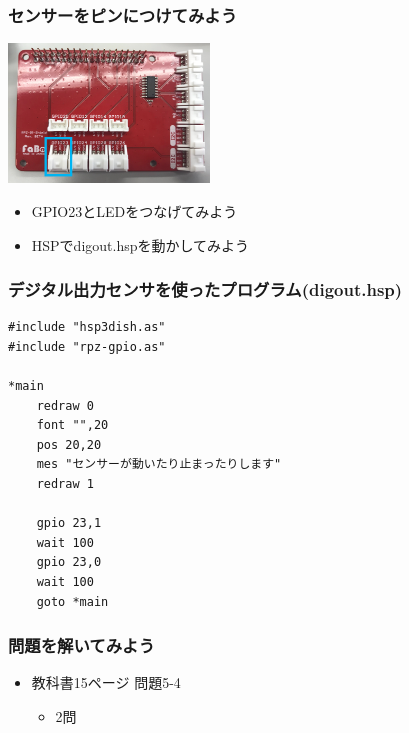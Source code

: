 \begin{frame}
    \frametitle{センサーをピンにつけてみよう}
    \begin{center}
        \includegraphics[width=0.4\textwidth]{images/chap05/text05-img027.png}
        \begin{itemize}
            \item GPIO23とLEDをつなげてみよう
            \item HSPでdigout.hspを動かしてみよう
        \end{itemize}
    \end{center}
\end{frame}

\begin{frame}[fragile]
    \frametitle{デジタル出力センサを使ったプログラム(digout.hsp)}
\begin{lstlisting}
#include "hsp3dish.as"
#include "rpz-gpio.as"

*main
    redraw 0
    font "",20
    pos 20,20
    mes "センサーが動いたり止まったりします"
    redraw 1

    gpio 23,1
    wait 100
    gpio 23,0
    wait 100
    goto *main
\end{lstlisting}
\end{frame}

\begin{frame}[fragile]
    \frametitle{問題を解いてみよう}
    \begin{itemize}
        \item 教科書15ページ 問題5-4
        \begin{itemize}
            \item 2問
        \end{itemize}
    \end{itemize}
\end{frame}